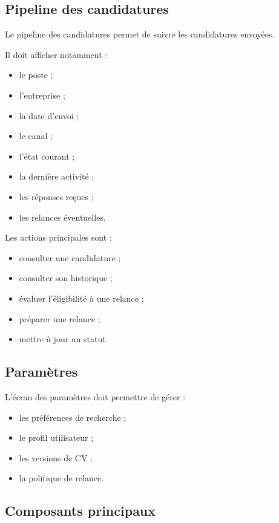 \documentclass[11pt,a4paper]{article}
\begin{document}
\subsection{Pipeline des candidatures}

Le pipeline des candidatures permet de suivre les candidatures envoyées.

Il doit afficher notamment :

\begin{itemize}
    \item le poste ;
    \item l’entreprise ;
    \item la date d’envoi ;
    \item le canal ;
    \item l’état courant ;
    \item la dernière activité ;
    \item les réponses reçues ;
    \item les relances éventuelles.
\end{itemize}

Les actions principales sont :

\begin{itemize}
    \item consulter une candidature ;
    \item consulter son historique ;
    \item évaluer l’éligibilité à une relance ;
    \item préparer une relance ;
    \item mettre à jour un statut.
\end{itemize}

\subsection{Paramètres}

L’écran des paramètres doit permettre de gérer :

\begin{itemize}
    \item les préférences de recherche ;
    \item le profil utilisateur ;
    \item les versions de CV ;
    \item la politique de relance.
\end{itemize}

\subsection{Composants principaux}
\end{document}
